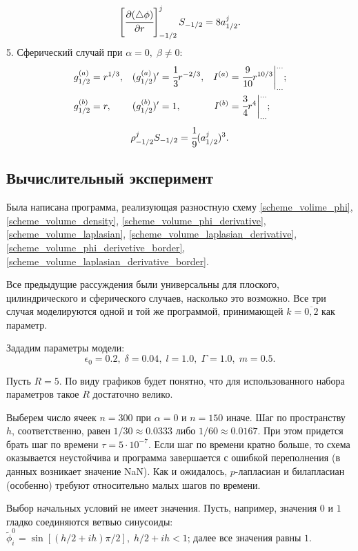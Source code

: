 \documentclass[a4paper,12pt]{article}
\theoremstyle{plain}
\theoremstyle{definition}
\begin{document}
$$\left[ \cfrac{\partial (\triangle \phi)}{\partial r} \right]_{-1/2}^j S_{-1/2} = 8 a_{1/2}^j \text{.}$$
5. Сферический случай при $\alpha = 0, \; \beta \neq 0$:
\begin{align*}
    g_{1/2}^{(a)} &= r^{1/3}, & (g_{1/2}^{(a)})' &= \cfrac{1}{3} r^{-2/3}, & I^{(a)} &= \cfrac{9}{10} r^{10/3} \bigg|_{...}^{...}  \text{;} \\
    g_{1/2}^{(b)} &= r, & (g_{1/2}^{(b)})' &= 1, & I^{(b)} &= \cfrac{3}{4} r^4 \bigg|_{...}^{...} \text{;}
\end{align*}
$$\rho_{-1/2}^j S_{-1/2} = \cfrac{1}{9} (a_{1/2}^j)^3 \text{.}$$
\endgroup


\subsection{Вычислительный эксперимент}

Была написана программа, реализующая разностную схему \eqref{scheme_volime_phi}, \eqref{scheme_volume_density}, \eqref{scheme_volume_phi_derivative}, \eqref{scheme_volume_laplasian}, \eqref{scheme_volume_laplasian_derivative}, \eqref{scheme_volume_phi_derivetive_border}, \eqref{scheme_volume_laplasian_derivative_border}.

Все предыдущие рассуждения были универсальны для плоского, цилиндрического и сферического случаев, насколько это возможно. Все три случая моделируются одной и той же программой, принимающей $k = \overline{0, 2}$ как параметр.

Зададим параметры модели:
$$\epsilon_0 = 0.2, \; \delta = 0.04, \; l = 1.0, \; \Gamma = 1.0, \; m = 0.5 \text{.}$$

Пусть $R = 5$. По виду графиков будет понятно, что для использованного набора параметров такое $R$ достаточно велико.

Выберем число ячеек $n = 300$ при $\alpha = 0$ и $n = 150$ иначе. Шаг по пространству~$h$, соответственно, равен $1/30 \approx 0.0333$ либо $1/60 \approx 0.0167$. При этом придется брать шаг по времени $\tau = 5 \cdot 10^{-7}$. Если шаг по времени кратно больше, то схема оказывается неустойчива и программа завершается с ошибкой переполнения (в данных возникает значение NaN). Как и ожидалось, $p$-лапласиан и билапласиан (особенно) требуют относительно малых шагов по времени.

Выбор начальных условий не имеет значения. Пусть, например, значения $0$ и $1$ гладко соединяются ветвью синусоиды: $\widetilde{\phi}_i^0 = \sin[(h/2 + ih) \pi / 2], \; h/2 + ih < 1$; далее все значения равны $1$.
\end{document}
